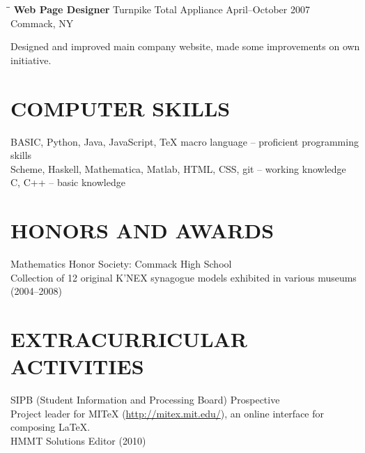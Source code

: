\documentclass{res}
\begin{document}
\begin{resume}
   \begin{tabbing}
   \hspace{2.3in}\= \hspace{2.6in}\= \kill %
    {\bf Web Page Designer} \>Turnpike Total Appliance     \>April--October 2007\\
                             \>Commack, NY
   \end{tabbing}\vspace{-20pt}      %
    Designed and improved main company website, made some improvements on own initiative.
          


\section{COMPUTER SKILLS}          
    BASIC, Python, Java, JavaScript, \TeX{} macro language -- proficient programming skills \\
    Scheme, Haskell, Mathematica, Matlab, HTML, CSS, git -- working knowledge \\
    C, C++ -- basic knowledge
 
 
\section{HONORS AND AWARDS}          
    Mathematics Honor Society: Commack High School  \\        
    Collection of 12 original K'NEX synagogue models exhibited in various museums (2004--2008)
 
\section{EXTRACURRICULAR ACTIVITIES}          
    SIPB (Student Information and Processing Board) Prospective \\
    \indent Project leader for MITeX (\url{http://mitex.mit.edu/}), an online interface for composing \LaTeX. \\
    HMMT Solutions Editor (2010)
    
 
\end{resume}
\end{document}
